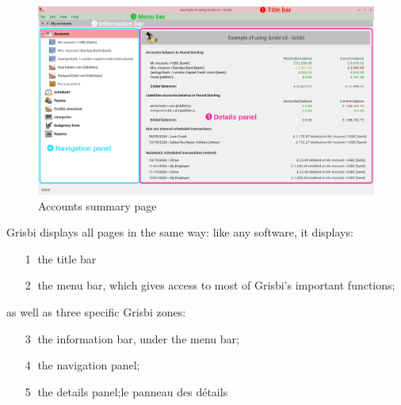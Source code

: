 
\begin{figure}[htbp]			%
	\begin{center}
		\includegraphics[width=1\textwidth]{image/screenshot/home_3.0.png}
	\end{center}
	\caption{Accounts summary page}		%
	\label{home_3.0}
\end{figure}


Grisbi displays all pages in the same way: like any software, it displays:

\begin{itemize}%
	\item[\large\textcircled{\small 1}] the title bar%
	\item[\large\textcircled{\small 2}] the menu bar, which gives access to most of Grisbi's important functions;%
\end{itemize}
as well as three specific Grisbi zones:%
\begin{itemize}%
	\item[\large\textcircled{\small 3}] the information bar, under the menu bar;%
	\item[\large\textcircled{\small 4}] the navigation panel;%
	\item[\large\textcircled{\small 5}] the details panel;le panneau des détails
\end{itemize}

